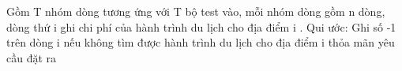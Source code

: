 Gồm T nhóm dòng tương ứng với T bộ test vào, mỗi nhóm dòng gồm n dòng, dòng thứ i ghi chi phí của hành trình du lịch cho địa điểm i . Qui ước: Ghi số -1 trên dòng i nếu không tìm được hành trình du lịch cho địa điểm i thỏa mãn yêu cầu đặt ra